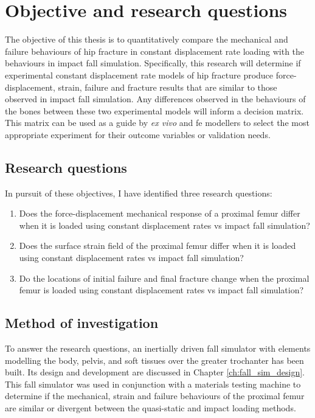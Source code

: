 \chapter{Objective and research questions}
\label{sec:intro_goals}
The objective of this thesis is to quantitatively compare the mechanical and failure behaviours of hip fracture in constant displacement rate loading with the behaviours in impact fall simulation.
Specifically, this research will determine if experimental constant displacement rate models of hip fracture produce force-displacement, strain, failure and fracture results that are similar to those observed in impact fall simulation.
Any differences observed in the behaviours of the bones between these two experimental models will inform a decision matrix.
This matrix can be used as a guide by \textit{ex vivo} and \ac{fe} modellers to select the most appropriate experiment for their outcome variables or validation needs.

\section{Research questions}
\label{sec:intro_goals_questions}
In pursuit of these objectives, I have identified three research questions:
\begin{enumerate}
\item Does the force-displacement mechanical response of a proximal femur differ when it is loaded using constant displacement rates \ac{vs} impact fall simulation?
\item Does the surface strain field of the proximal femur differ when it is loaded using constant displacement rates \ac{vs} impact fall simulation?
\item Do the locations of initial failure and final fracture change when the proximal femur is loaded using constant displacement rates \ac{vs} impact fall simulation?
\end{enumerate}

\section{Method of investigation}
\label{sec:intro_method}
To answer the research questions, an inertially driven fall simulator with elements modelling the body, pelvis, and soft tissues over the greater trochanter has been built.
Its design and development are discussed in Chapter \ref{ch:fall_sim_design}.
This fall simulator was used in conjunction with a materials testing machine to determine if the mechanical, strain and failure  behaviours of the proximal femur are similar or divergent between the quasi-static and impact loading methods.

